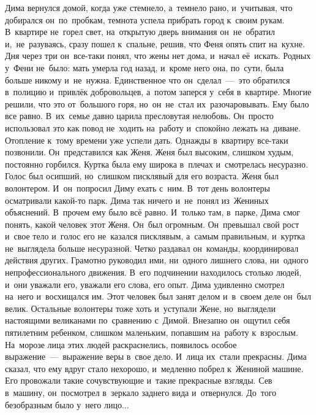 Дима вернулся домой, когда уже стемнело, а~темнело рано, и~учитывая, что добирался он~по~пробкам, темнота успела прибрать город к~своим рукам.
В~квартире не~горел свет, на~открытую дверь внимания он~не~обратил и,~не~разуваясь, сразу пошел к~спальне, решив, что Феня опять спит на~кухне.
Дня через три он~все-таки понял, что жены нет дома, и~начал её~искать.
Родных у~Фени не~было: мать умерла год назад, и~кроме него она, по~сути, была больше никому и~не~нужна.
Единственное что он~сделал~---~это обратился в~полицию и~привлёк добровольцев, а~потом заперся у~себя в~квартире.
Многие решили, что это от~большого горя, но~он~не~стал их~разочаровывать.
Ему было все равно.
В~их~семье давно царила пресловутая нелюбовь.
Он~просто использовал это как повод не~ходить на~работу и~спокойно лежать на~диване.
Отопление к~тому времени уже успели дать.
Однажды в~квартиру все-таки позвонили.
Он~представился как Женя.
Женя был высоким, слишком худым, постоянно горбился.
Куртка была ему широка в~плечах и~смотрелась несуразно.
Голос был осипший, но~слишком писклявый для его возраста.
Женя был волонтером.
И~он~попросил Диму ехать с~ним.
В~тот день волонтеры осматривали какой-то парк.
Дима так ничего и~не~понял из~Жениных объяснений.
В~прочем ему было всё равно.
И~только там, в~парке, Дима смог понять, какой человек этот Женя.
Он~был огромным.
Он~превышал свой рост и~свое тело и~голос его не~казался писклявым, а~самым правильным, и~куртка не~выглядела больше несуразной.
Четко раздавал он~команды, координировал действия других.
Грамотно руководил ими, ни~одного лишнего слова, ни~одного непрофессионального движения.
В~его подчинении находилось столько людей, и~они уважали его, уважали его слова, его опыт.
Дима удивленно смотрел на~него и~восхищался им.
Этот человек был занят делом и~в~своем деле он~был велик.
Остальные волонтеры тоже хоть и~уступали Жене, но~выглядели настоящими великанами по~сравнению с~Димой.
Внезапно он~ощутил себя пятилетним ребенком, слишком маленьким, попавшим на~работу к~взрослым.
На~морозе лица этих людей раскраснелись, появилось особое выражение~---~выражение веры в~свое дело.
И~лица их~стали прекрасны.
Дима сказал, что ему вдруг стало нехорошо, и~медленно побрел к~Жениной машине.
Его провожали такие сочувствующие и~такие прекрасные взгляды.
Сев в~машину, он~посмотрел в~зеркало заднего вида и~отвернулся.
До~того безобразным было у~него лицо...





